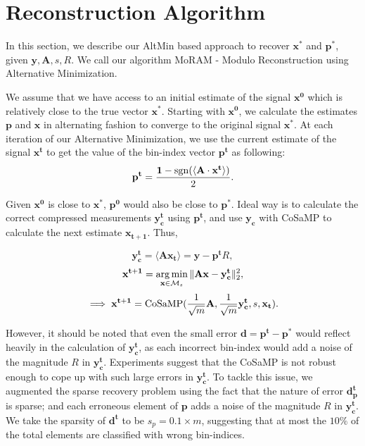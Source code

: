 \section{Reconstruction Algorithm}

In this section, we describe our AltMin based approach to recover $\mathbf{x^*}$ and $\mathbf{p^*}$, given $\mathbf{y, A}, s, R$. We call our algorithm MoRAM - Modulo Reconstruction using Alternative Minimization.

We assume that we have access to an initial estimate of the signal $\mathbf{{x}^0}$ which is relatively close to the true vector $\mathbf{x^*}$. Starting with $\mathbf{{x}^0}$, we  calculate the estimates $\mathbf{p}$ and $\mathbf{x}$ in alternating fashion to converge to the original signal $\mathbf{x^*}$. At each iteration of our Alternative Minimization, we use the current estimate of the signal ${\mathbf{x^t}}$ to get the value of the bin-index vector $\mathbf{{p}^t}$ as following:
\begin{equation}
\mathbf{{p}^{t}} = \frac{\mathbf{1}-\mathrm{sgn}(\langle \mathbf{A} \cdot \mathbf{x^t} \rangle)}{2}.
\label{step1}
\end{equation}

 
 Given $\mathbf{x^0}$ is close to $\mathbf{x^*}$, $\mathbf{p^0}$ would also be close to $\mathbf{p^*}$. Ideal way is to calculate the correct compressed measurements $\mathbf{y^t_c}$ using $\mathbf{p^t}$, and use $\mathbf{y_c}$ with CoSaMP to calculate the next estimate $\mathbf{{x}_{t+1}}$. Thus,


$$
\mathbf{y^t_c} = \langle \mathbf{A}\mathbf{x_{t}} \rangle = \mathbf{y} - \mathbf{p^t}R,
$$
$$
\mathbf{{x}^{t+1}} = \argmin_{\mathbf{x} \in \mathcal{M}_s}\norm{\mathbf{Ax} - \mathbf{y^t_c}}_2^2, %
$$
$$
\implies \mathbf{{x}^{t+1}} = \mathrm{CoSaMP}(\frac{1}{\sqrt{m}}\mathbf{A},\frac{1}{\sqrt{m}}\mathbf{y^t_c},s,\mathbf{x_t}).
$$

 However, it should be noted that even the small error $\mathbf{d} = \mathbf{p^t - p^*}$ would reflect heavily in the calculation of $\mathbf{y^t_c}$, as each incorrect bin-index would add a noise of the magnitude $R$ in $\mathbf{y^t_c}$. Experiments suggest that the CoSaMP is not robust enough to cope up with such large errors in $\mathbf{y^t_c}$. To tackle this issue, we augmented the sparse recovery problem using the fact that the nature of error $\mathbf{d^t_p}$ is sparse; and each erroneous element of $\mathbf{p}$ adds a noise of the magnitude $R$ in $\mathbf{y^t_c}$. We take the sparsity of $\mathbf{d^t}$ to be $s_p = 0.1\times m$, suggesting that at most the $10\%$ of the total elements are classified with wrong bin-indices.
 
